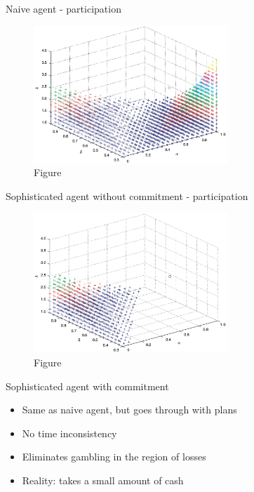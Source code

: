 \documentclass[11pt, aspectratio=169]{beamer}
\begin{document}
\begin{frame}{Naive agent - participation}
\begin{figure}
\centering
    \includegraphics[width = 0.65\textwidth]{cpt_naive}
    \caption{Figure \citet{Barberis2012a}}
    \end{figure}
\end{frame}

\begin{frame}{Sophisticated agent without commitment - participation}
\begin{figure}
\centering
    \includegraphics[width = 0.65\textwidth]{cpt_sophisticated}
    \caption{Figure \citet{Barberis2012a}}
    \end{figure}
\end{frame}


\begin{frame}{Sophisticated agent with commitment}
    \begin{itemize}
        \item Same as naive agent, but goes through with plans\medskip
        \item No time inconsistency \medskip
        \item Eliminates gambling in the region of losses\medskip
        \item Reality: takes a small amount of cash\medskip
    \end{itemize}
\end{frame}
\end{document}
